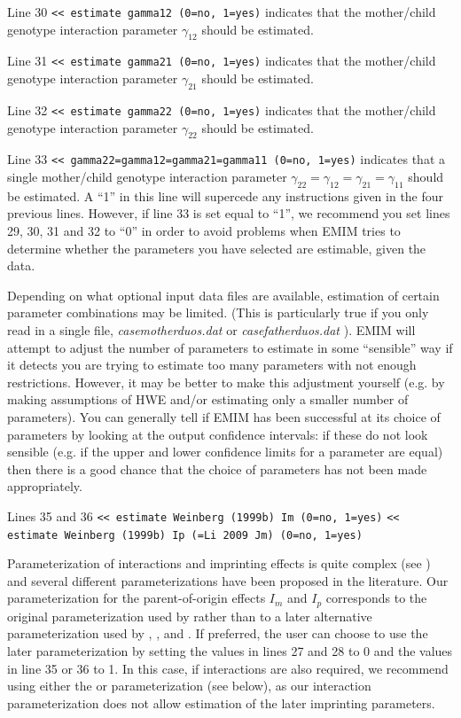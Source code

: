 \documentclass[a4paper,12pt]{article}
\newcommand{\code}[1]{{\footnotesize{{\tt #1}}}}
\begin{document}
Line 30 \code{<< estimate gamma12 (0=no, 1=yes)} indicates that the mother/child genotype interaction parameter $\gamma_{12}$ should be estimated. 

Line 31 \code{<< estimate gamma21 (0=no, 1=yes)} indicates that the mother/child genotype interaction parameter $\gamma_{21}$ should be estimated. 

Line 32 \code{<< estimate gamma22 (0=no, 1=yes)} indicates that the mother/child genotype interaction parameter $\gamma_{22}$ should be estimated. 

Line 33 \code{<< gamma22=gamma12=gamma21=gamma11 (0=no, 1=yes)} indicates that a single mother/child genotype interaction parameter $\gamma_{22}=\gamma_{12}=\gamma_{21}=\gamma_{11}$ should be estimated. A ``1'' in this line will supercede any instructions given in the four previous lines. However, if line 33 is set equal to ``1'', we recommend you set lines 29, 30, 31 and 32 to ``0'' in order to avoid problems when EMIM tries to determine whether the parameters you have selected are estimable, given the data. 

Depending on what optional input data files are available, estimation of certain parameter combinations may be limited. (This is particularly true if you only read in a single file, {\it casemotherduos.dat} or {\it casefatherduos.dat} ). EMIM will attempt to adjust the number of parameters to estimate in some ``sensible'' way if it detects you are trying to estimate too many parameters with not enough restrictions. However, it may be better to make this adjustment yourself (e.g. by making assumptions of HWE and/or estimating only a smaller number of parameters). You can generally tell if EMIM has been successful at its choice of parameters by looking at the output confidence intervals: if these do not look sensible (e.g. if the upper and lower confidence limits for a parameter are equal) then there is a good chance that the choice of parameters has not been made appropriately. 

Lines 35 and 36 \code{<< estimate Weinberg (1999b) Im (0=no, 1=yes)} \code{<< estimate Weinberg (1999b) Ip (=Li 2009 Jm) (0=no, 1=yes)} 

Parameterization of interactions and imprinting effects is quite complex (see \citet{ainsworth:etal:11}) and several different parameterizations have been proposed in the literature. Our parameterization for the parent-of-origin effects $I_m$ and $I_p$ corresponds to the original parameterization used by \citet{weinberg:etal:98} rather than to a later alternative parameterization used by \citet{weinberg:99b}, \citet{parimi:etal:08}, and \citet{li:etal:09}. If preferred, the user can choose to use the later parameterization by setting the values in lines 27 and 28 to 0 and the values in line 35 or 36 to 1. In this case, if interactions are also required, we recommend using either the \citet{sinsheimer:etal:03} or \citet{palmer:etal:06} parameterization (see below), as our interaction parameterization does not allow estimation of the later \citet{weinberg:99b} imprinting parameters. 
\end{document}

